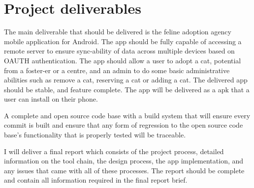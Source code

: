 \documentclass[11pt,fleqn,twoside]{article}
\begin{document}
\section{Project deliverables}

The main deliverable that should be delivered is the feline adoption agency mobile application for Android. The app should be fully capable of accessing a remote server to ensure sync-ability of data across multiple devices based on OAUTH authentication. The app should allow a user to adopt a cat, potential from a foster-er or a centre, and an admin to do some basic administrative abilities such as remove a cat, reserving a cat or adding a cat. The delivered app should be stable, and feature complete. The app will be delivered as a apk that a user can install on their phone.

A complete and open source code base with a build system that will ensure every commit is built and ensure that any form of regression to the open source code base's functionality that is properly tested will be traceable.

I will deliver a final report which consists of the project process, detailed information on the tool chain, the design process, the app implementation, and any issues that came with all of these processes. The report should be complete and contain all information required in the final report brief.

\nocite{*} %

\newpage

%
% 

\renewcommand{\refname}{Annotated Bibliography}  %
\end{document}
